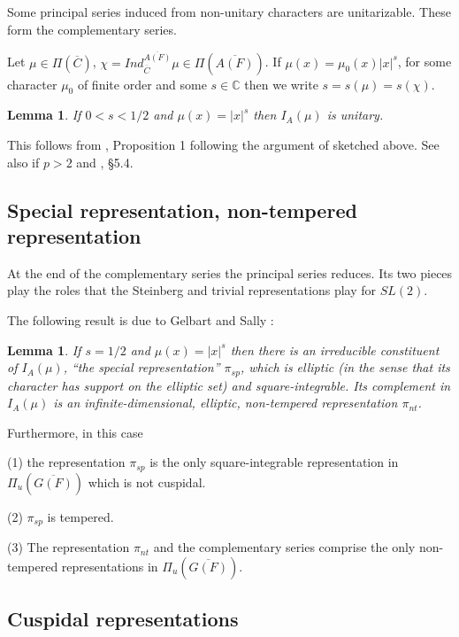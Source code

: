 \documentclass[12pt,letterpaper]{book}
\theoremstyle{plain}
\newtheorem{lemma}[theorem]{Lemma}
\theoremstyle{definition}
\theoremstyle{remark}
\theoremstyle{remark}
\begin{document}
Some principal series induced from non-unitary characters are unitarizable. These form the complementary series.


Let $\mu \in \Pi (\overline{C})$,
$\chi =Ind_{\overline{C}}^{\overline{A(F)}}\mu \in
\Pi (\overline{A(F)})$. If $\mu (x)=\mu _0(x)|x|^s$, for some
character $\mu _0$ of finite order and some $s\in {\mathbb C}$ then
we write $s=s(\mu )=s(\chi )$.

\begin{lemma} If $0<s<1/2$ and $\mu (x)=|x|^s$ then $I_A(\mu )$ is unitary.
\end{lemma}

This follows from \cite{GS}, Proposition 1 following
the argument of \cite{Ar} sketched above. See also
\cite{Mo1} if $p>2$ and \cite{Ge1}, \S 5.4.

\subsection{Special representation, non-tempered representation}

At the end of the complementary series the principal series reduces. Its two pieces play the roles that the Steinberg and trivial representations play for $SL(2)$.


The following result is due to Gelbart and Sally \cite{GS}:

\begin{lemma}
If $s=1/2$ and $\mu (x)=|x|^s$ then there is an irreducible
constituent of $I_A(\mu)$, ``the special
representation'' $\pi _{sp}$, which is elliptic (in the sense that its
character has support on the elliptic set) and square-integrable.
Its complement in $I_A(\mu)$ is an infinite-dimensional,
elliptic, non-tempered representation $\pi _{nt}$.
\end{lemma}

Furthermore, in this case

(1) the representation $\pi _{sp}$ is the only square-integrable
representation in $\Pi _u(\overline{G(F)})$ which is not cuspidal.

(2) $\pi _{sp}$ is tempered.

(3) The representation $\pi _{nt}$ and the complementary series comprise the
only non-tempered representations in $\Pi _u(\overline{G(F)})$.

\subsection{Cuspidal representations}
\end{document}
